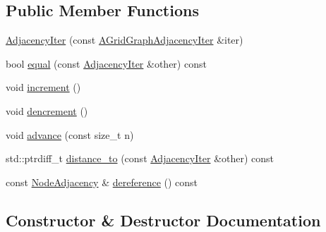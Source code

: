 \subsection*{Public Member Functions}
\begin{DoxyCompactItemize}
\item 
\hyperlink{classnifty_1_1graph_1_1detail__graph_1_1UndirectedGridGraphIter_1_1AdjacencyIter_a45cfeba6901be7c013bfbd4b2f1fe99e}{Adjacency\+Iter} (const \hyperlink{classnifty_1_1graph_1_1detail__graph_1_1UndirectedGridGraphIter_a824924927d819949af2370aa628af595}{A\+Grid\+Graph\+Adjacency\+Iter} \&iter)
\item 
bool \hyperlink{classnifty_1_1graph_1_1detail__graph_1_1UndirectedGridGraphIter_1_1AdjacencyIter_a60d075daad4bbefb8dbc6c5db1562335}{equal} (const \hyperlink{classnifty_1_1graph_1_1detail__graph_1_1UndirectedGridGraphIter_1_1AdjacencyIter}{Adjacency\+Iter} \&other) const 
\item 
void \hyperlink{classnifty_1_1graph_1_1detail__graph_1_1UndirectedGridGraphIter_1_1AdjacencyIter_ad6a4c23c77e26cd510a5e123eb39ad8e}{increment} ()
\item 
void \hyperlink{classnifty_1_1graph_1_1detail__graph_1_1UndirectedGridGraphIter_1_1AdjacencyIter_a8703126f4b9dd746d511980501bc8a51}{dencrement} ()
\item 
void \hyperlink{classnifty_1_1graph_1_1detail__graph_1_1UndirectedGridGraphIter_1_1AdjacencyIter_ae004ba059ca82951e1480c08730c6bf6}{advance} (const size\+\_\+t n)
\item 
std\+::ptrdiff\+\_\+t \hyperlink{classnifty_1_1graph_1_1detail__graph_1_1UndirectedGridGraphIter_1_1AdjacencyIter_a0d6fe1be2a1342e475d6de63363a3336}{distance\+\_\+to} (const \hyperlink{classnifty_1_1graph_1_1detail__graph_1_1UndirectedGridGraphIter_1_1AdjacencyIter}{Adjacency\+Iter} \&other) const 
\item 
const \hyperlink{classnifty_1_1graph_1_1detail__graph_1_1UndirectedGridGraphIter_ab102d464df39aae71f7482baa37d8966}{Node\+Adjacency} \& \hyperlink{classnifty_1_1graph_1_1detail__graph_1_1UndirectedGridGraphIter_1_1AdjacencyIter_a8a284849a260d2485910d4c63d2a2a22}{dereference} () const 
\end{DoxyCompactItemize}


\subsection{Constructor \& Destructor Documentation}
\hypertarget{classnifty_1_1graph_1_1detail__graph_1_1UndirectedGridGraphIter_1_1AdjacencyIter_a45cfeba6901be7c013bfbd4b2f1fe99e}{}
